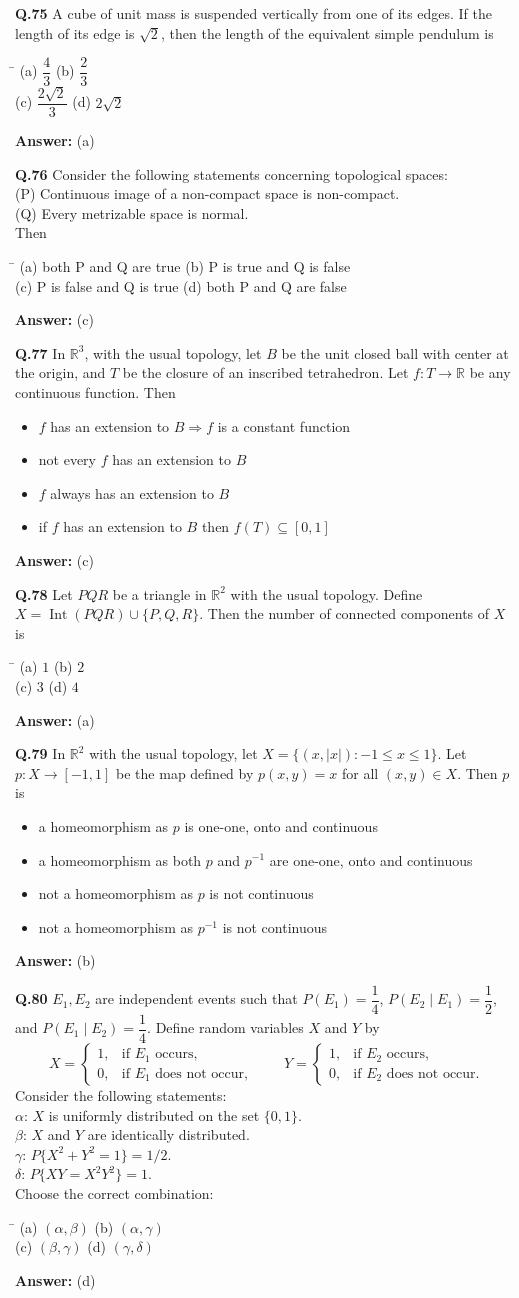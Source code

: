 \documentclass[11pt,a4paper]{article}
\newcommand{\optsfour}[4]{%
  \begin{tabbing}
    \hspace{0.48\linewidth}\=\kill
    (a) #1 \> (b) #2 \\[2pt]
    (c) #3 \> (d) #4
  \end{tabbing}%
}
\newcommand{\optslist}[4]{%
  \begin{itemize}
    \setlength{\itemsep}{2pt}\setlength{\parskip}{0pt}
    \item[(a)] #1
    \item[(b)] #2
    \item[(c)] #3
    \item[(d)] #4
  \end{itemize}%
}
\newcommand{\ans}[1]{\textbf{Answer:} #1\par\medskip}
\begin{document}
\textbf{Q.75} A cube of unit mass is suspended vertically from one of its edges. If the length of its edge is $\sqrt{2}$, then the length of the equivalent simple pendulum is
\optsfour{$\dfrac{4}{3}$}{$\dfrac{2}{3}$}{$\dfrac{2\sqrt{2}}{3}$}{$2\sqrt{2}$}
\ans{(a)}

\textbf{Q.76} Consider the following statements concerning topological spaces:\\
(P) Continuous image of a non-compact space is non-compact.\\
(Q) Every metrizable space is normal.\\
Then
\optsfour{both P and Q are true}{P is true and Q is false}{P is false and Q is true}{both P and Q are false}
\ans{(c)}

\textbf{Q.77} In $\mathbb{R}^3$, with the usual topology, let $B$ be the unit closed ball with center at the origin, and $T$ be the closure of an inscribed tetrahedron. Let $f : T \to \mathbb{R}$ be any continuous function. Then
\optslist{$f$ has an extension to $B \Rightarrow f$ is a constant function}{not every $f$ has an extension to $B$}{$f$ always has an extension to $B$}{if $f$ has an extension to $B$ then $f(T) \subseteq [0, 1]$}
\ans{(c)}

\textbf{Q.78} Let $PQR$ be a triangle in $\mathbb{R}^2$ with the usual topology. Define $X = \operatorname{Int}(PQR) \cup \{P, Q, R\}$. Then the number of connected components of $X$ is
\optsfour{$1$}{$2$}{$3$}{$4$}
\ans{(a)}

\textbf{Q.79} In $\mathbb{R}^2$ with the usual topology, let $X = \{(x, |x|) : -1 \le x \le 1\}$. Let $p : X \to [-1, 1]$ be the map defined by $p(x,y) = x$ for all $(x,y) \in X$. Then $p$ is
\optslist{a homeomorphism as $p$ is one-one, onto and continuous}{a homeomorphism as both $p$ and $p^{-1}$ are one-one, onto and continuous}{not a homeomorphism as $p$ is not continuous}{not a homeomorphism as $p^{-1}$ is not continuous}
\ans{(b)}

\textbf{Q.80} $E_1, E_2$ are independent events such that $P(E_1) = \dfrac{1}{4}$, $P(E_2 \mid E_1) = \dfrac{1}{2}$, and $P(E_1 \mid E_2) = \dfrac{1}{4}$. Define random variables $X$ and $Y$ by
\[
  X = \begin{cases} 1, & \text{if } E_1 \text{ occurs}, \\ 0, & \text{if } E_1 \text{ does not occur}, \end{cases}
  \qquad
  Y = \begin{cases} 1, & \text{if } E_2 \text{ occurs}, \\ 0, & \text{if } E_2 \text{ does not occur}. \end{cases}
\]
Consider the following statements:\\
$\alpha$: $X$ is uniformly distributed on the set $\{0, 1\}$.\\
$\beta$: $X$ and $Y$ are identically distributed.\\
$\gamma$: $P\{X^2 + Y^2 = 1\} = 1/2$.\\
$\delta$: $P\{XY = X^2 Y^2\} = 1$.\\
Choose the correct combination:
\optsfour{$(\alpha, \beta)$}{$(\alpha, \gamma)$}{$(\beta, \gamma)$}{$(\gamma, \delta)$}
\ans{(d)}
\end{document}

